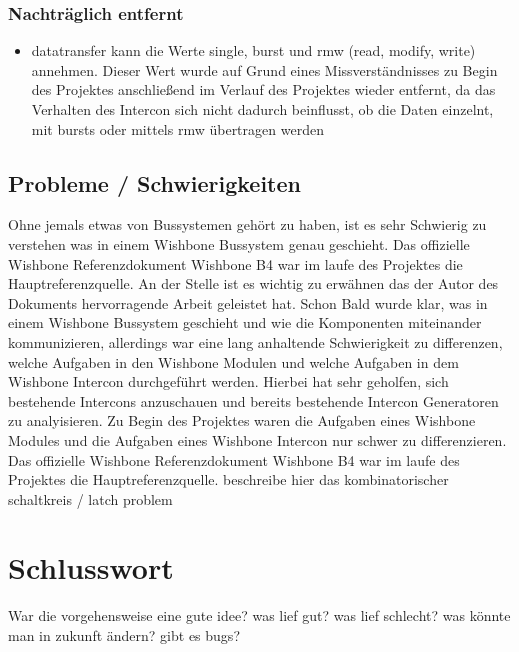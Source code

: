 \documentclass{article}
\begin{document}
\subsubsection{Nachträglich entfernt}
\begin{itemize}
\item datatransfer
kann die Werte single, burst und rmw (read, modify, write) annehmen. Dieser Wert wurde auf Grund eines Missverständnisses zu Begin des Projektes anschließend im Verlauf des Projektes wieder entfernt, da das Verhalten des Intercon sich nicht dadurch beinflusst, ob die Daten einzelnt, mit bursts oder mittels rmw übertragen werden
\end{itemize}
\subsection{Probleme / Schwierigkeiten}
Ohne jemals etwas von Bussystemen gehört zu haben, ist es sehr Schwierig zu verstehen was in einem Wishbone Bussystem genau geschieht. Das offizielle Wishbone Referenzdokument \glqq Wishbone B4 \grqq war im laufe des Projektes die Hauptreferenzquelle. An der Stelle ist es wichtig zu erwähnen das der Autor des Dokuments hervorragende Arbeit geleistet hat. Schon Bald wurde klar, was in einem Wishbone Bussystem geschieht und wie die Komponenten miteinander kommunizieren, allerdings war eine lang anhaltende Schwierigkeit zu differenzen, welche Aufgaben in den Wishbone Modulen und welche Aufgaben in dem Wishbone Intercon durchgeführt werden. Hierbei hat sehr geholfen, sich bestehende Intercons anzuschauen und bereits bestehende Intercon Generatoren zu analyisieren.
Zu Begin des Projektes waren die Aufgaben eines Wishbone Modules und die Aufgaben eines Wishbone Intercon nur schwer zu differenzieren. Das offizielle Wishbone Referenzdokument \glqq Wishbone B4 \grqq war im laufe des Projektes die Hauptreferenzquelle.
beschreibe hier das kombinatorischer schaltkreis / latch problem
\section{Schlusswort}
War die vorgehensweise eine gute idee?
was lief gut?
was lief schlecht?
was könnte man in zukunft ändern?
gibt es bugs?
\end{document}
